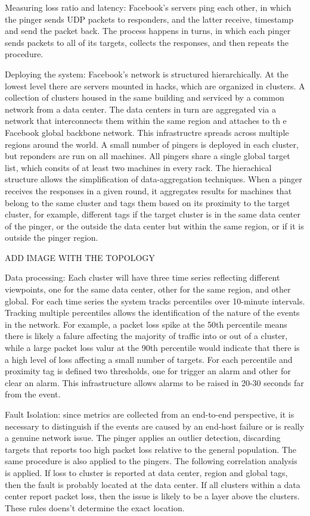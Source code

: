 Measuring loss ratio and latency: Facebook's servers ping each other, in which
the pinger sends UDP packets to responders, and the latter receive, timestamp
and send the packet back. The process happens in turns, in which each pinger
sends packets to all of its targets, collects the responses, and then repeats
the procedure.

Deploying the system: Facebook's network is structured hierarchically. At the
lowest level there are servers mounted in hacks, which are organized in
clusters. A collection of clusters housed in the same building and serviced by
a common network from a data center. The data centers in turn are aggregated
via a network that interconnects them within the same region and attaches to th
e Facebook global backbone network. This infrastructre spreads across multiple
regions around the world.
A small number of pingers is deployed in each cluster, but reponders are run on
all machines. All pingers share a single global target list, which consits of
at least two machines in every rack.
The hierachical structure allows the simplification of data-aggregation
techniques. When a pinger receives the responses in a given round, it
aggregates results for machines that belong to the same cluster and tags them
based on its proximity to the target cluster, for example, different tags if
the target cluster is in the same data center of the pinger, or the outside the
data center but within the same region, or if it is outside the pinger region.

ADD IMAGE WITH THE TOPOLOGY

Data processing: Each cluster will have three time series reflecting different
viewpoints, one for the same data center, other for the same region, and other
global. For each time series the system tracks percentiles over 10-minute
intervals. Tracking multiple percentiles allows the identification of the
nature of the events in the network. For example, a packet loss spike at the
50th percentile means there is likely a falure affecting the majority of
traffic into or out of a cluster, while a large packet loss valur at the 90th
percentile would indicate that there is a high level of loss affecting a small
number of targets. For each percentile and proximity tag is defined two
thresholds, one for trigger an alarm and other for clear an alarm. This
infrastructure allows alarms to be raised in 20-30 seconds far from the event.

Fault Isolation: since metrics are collected from an end-to-end perspective, it
is necessary to distinguish if the events are caused by an end-host failure or
is really a genuine network issue. The pinger applies an outlier detection,
discarding targets that reports too high packet loss relative to the general
population. The same procedure is also applied to the pingers. The following
correlation analysis is applied. If loss to cluster is reported at data center,
region and global tags, then the fault is probably located at the data center.
If all clusters within a data center report packet loss, then the issue is
likely to be a layer above the clusters. These rules doens't determine the
exact location.

